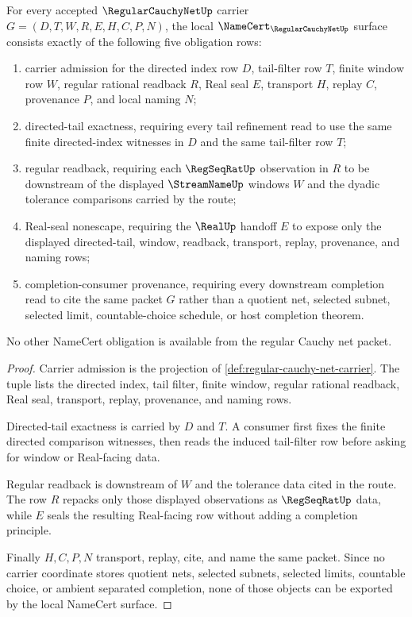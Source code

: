 \begin{theorem}
\label{thm:regular-cauchy-net-namecert-obligations}
For every accepted $\RegularCauchyNetUp$ carrier $G=(D,T,W,R,E,H,C,P,N)$, the local $\NameCert_{\RegularCauchyNetUp}$ surface consists exactly of the following five obligation rows:
\begin{enumerate}
\item carrier admission for the directed index row $D$, tail-filter row $T$, finite window row $W$, regular rational readback $R$, Real seal $E$, transport $H$, replay $C$, provenance $P$, and local naming $N$;
\item directed-tail exactness, requiring every tail refinement read to use the same finite directed-index witnesses in $D$ and the same tail-filter row $T$;
\item regular readback, requiring each $\RegSeqRatUp$ observation in $R$ to be downstream of the displayed $\StreamNameUp$ windows $W$ and the dyadic tolerance comparisons carried by the route;
\item Real-seal nonescape, requiring the $\RealUp$ handoff $E$ to expose only the displayed directed-tail, window, readback, transport, replay, provenance, and naming rows;
\item completion-consumer provenance, requiring every downstream completion read to cite the same packet $G$ rather than a quotient net, selected subnet, selected limit, countable-choice schedule, or host completion theorem.
\end{enumerate}
No other NameCert obligation is available from the regular Cauchy net packet.
\end{theorem}
\begin{proof}
Carrier admission is the projection of \autoref{def:regular-cauchy-net-carrier}. The tuple lists the directed index, tail filter, finite window, regular rational readback, Real seal, transport, replay, provenance, and naming rows.

Directed-tail exactness is carried by $D$ and $T$. A consumer first fixes the finite directed comparison witnesses, then reads the induced tail-filter row before asking for window or Real-facing data.

Regular readback is downstream of $W$ and the tolerance data cited in the route. The row $R$ repacks only those displayed observations as $\RegSeqRatUp$ data, while $E$ seals the resulting Real-facing row without adding a completion principle.

Finally $H,C,P,N$ transport, replay, cite, and name the same packet. Since no carrier coordinate stores quotient nets, selected subnets, selected limits, countable choice, or ambient separated completion, none of those objects can be exported by the local NameCert surface.
\end{proof}

